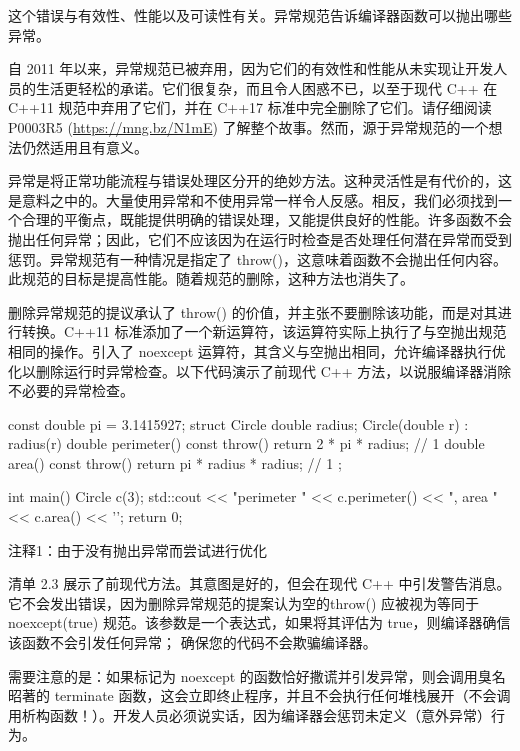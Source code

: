 
这个错误与有效性、性能以及可读性有关。异常规范告诉编译器函数可以抛出哪些异常。


自 2011 年以来，异常规范已被弃用，因为它们的有效性和性能从未实现让开发人员的生活更轻松的承诺。它们很复杂，而且令人困惑不已，以至于现代 C++ 在 C++11 规范中弃用了它们，并在 C++17 标准中完全删除了它们。请仔细阅读 P0003R5 (\url{https://mng.bz/N1mE}) 了解整个故事。然而，源于异常规范的一个想法仍然适用且有意义。

异常是将正常功能流程与错误处理区分开的绝妙方法。这种灵活性是有代价的，这是意料之中的。大量使用异常和不使用异常一样令人反感。相反，我们必须找到一个合理的平衡点，既能提供明确的错误处理，又能提供良好的性能。许多函数不会抛出任何异常；因此，它们不应该因为在运行时检查是否处理任何潜在异常而受到惩罚。异常规范有一种情况是指定了 throw()，这意味着函数不会抛出任何内容。此规范的目标是提高性能。随着规范的删除，这种方法也消失了。

删除异常规范的提议承认了 throw() 的价值，并主张不要删除该功能，而是对其进行转换。C++11 标准添加了一个新运算符，该运算符实际上执行了与空抛出规范相同的操作。引入了 noexcept 运算符，其含义与空抛出相同，允许编译器执行优化以删除运行时异常检查。以下代码演示了前现代 C++ 方法，以说服编译器消除不必要的异常检查。


\begin{cpp}
const double pi = 3.1415927;
struct Circle {
  double radius;
  Circle(double r) : radius(r) {}
  double perimeter() const throw() { return 2 * pi * radius; } // 1
  double area() const throw() { return pi * radius * radius; } // 1
};

int main() {
  Circle c(3);
  std::cout << "perimeter " << c.perimeter() << ", area " << c.area() << '\n';
  return 0;
}
\end{cpp}

{\footnotesize
注释1：由于没有抛出异常而尝试进行优化
}


清单 2.3 展示了前现代方法。其意图是好的，但会在现代 C++ 中引发警告消息。它不会发出错误，因为删除异常规范的提案认为空的throw() 应被视为等同于 noexcept(true) 规范。该参数是一个表达式，如果将其评估为 true，则编译器确信该函数不会引发任何异常； 确保您的代码不会欺骗编译器。

需要注意的是：如果标记为 noexcept 的函数恰好撒谎并引发异常，则会调用臭名昭著的 terminate 函数，这会立即终止程序，并且不会执行任何堆栈展开（不会调用析构函数！）。开发人员必须说实话，因为编译器会惩罚未定义（意外异常）行为。

